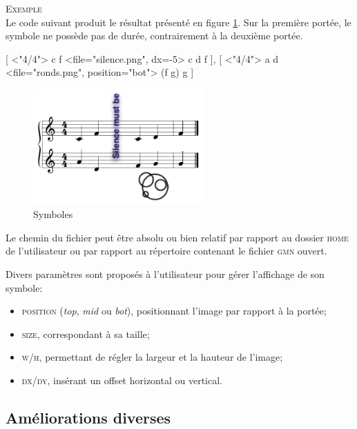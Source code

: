 \documentclass{article}
\newenvironment{gmncode}	{\vspace{-2mm}\small\verbatim}{\endverbatim\vspace{-2mm}}
\newcommand{\exemple}		{\vspace{2mm}\hspace*{-6mm}\textsc{Exemple}}
\begin{document}
\exemple\\
Le code suivant produit le résultat présenté en figure \ref{fig:symbol}. Sur la première portée, le symbole ne possède pas de durée, contrairement à la deuxième portée.

\begin{gmncode}
{
  [
    \meter<"4/4"> c f
    \symbol<file="silence.png", dx=-5> 
    c d f
  ],
  [
    \meter<"4/4"> a d
    \symbol<file="ronds.png",
      position="bot"> (f g) g
  ]
}
\end{gmncode}

\begin{figure}[h]
\centering
\includegraphics[width=65mm]{img/partitions/symbol.pdf}
\caption{Symboles}
\label{fig:symbol}
\end{figure}

Le chemin du fichier peut être absolu ou bien relatif par rapport au dossier \textsc{home} de l'utilisateur ou par rapport au répertoire contenant le fichier \textsc{gmn} ouvert.

Divers paramètres sont proposés à l'utilisateur pour gérer l'affichage de son symbole:
\begin{itemize}
	\item \textsc{position} (\emph{top}, \emph{mid} ou \emph{bot}), positionnant l'image par rapport à la portée;
	\item \textsc{size}, correspondant à sa taille;
	\item \textsc{w/h}, permettant de régler la largeur et la hauteur de l'image;
	\item \textsc{dx/dy}, insérant un offset horizontal ou vertical.
\end{itemize}

\subsection{Améliorations diverses}\label{subsec:amelioraions}


\end{document}
